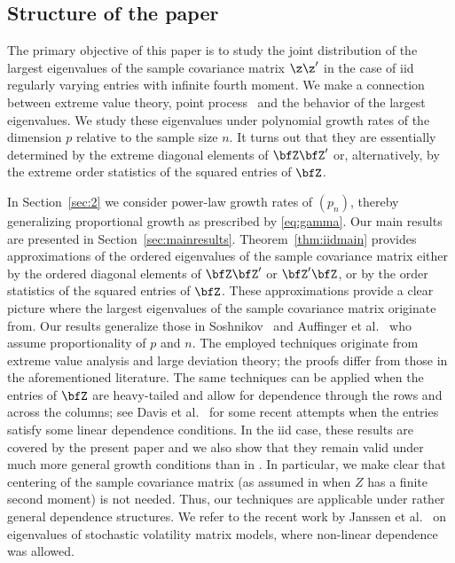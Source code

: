 \subsection{Structure of the paper}
The primary objective of this paper is to study the joint distribution of the largest eigenvalues of the sample covariance matrix $\z\z'$
in the case of iid regularly varying entries with infinite fourth moment.
We make a connection between extreme value theory, point process \con\ and the behavior of the largest eigenvalues. 
We study these eigenvalues under polynomial 
growth rates of the dimension $p$ relative to the sample size $n$. 
It turns out that they are essentially determined by the extreme diagonal elements of $\bfZ\bfZ'$ or, alternatively, 
by the extreme order statistics of the squared entries of $\bfZ$.  
\par
In Section~\ref{sec:2} we consider power-law growth rates of $(p_n)$, 
thereby generalizing proportional growth as prescribed by \eqref{eq:gamma}.
Our main results are presented in Section~\ref{sec:mainresults}. 
Theorem~\ref{thm:iidmain} provides approximations of the ordered eigenvalues of the sample covariance matrix either by
the ordered diagonal elements of $\bfZ\bfZ'$ or $\bfZ'\bfZ$, or by the order statistics of the squared entries of $\bfZ$.
These approximations provide a clear picture where the largest eigenvalues of the sample covariance matrix originate from. 
Our results generalize those in Soshnikov~\cite{soshnikov:2004,soshnikov:2006} and 
Auffinger et al.~\cite{auffinger:arous:peche:2009} who assume proportionality of $p$ and $n$.
The employed techniques originate from extreme value analysis and large deviation theory; the proofs differ from those 
in the aforementioned literature. 
The same techniques can be applied when the entries of $\bfZ$ 
are heavy-tailed and allow for dependence through the rows and across the columns; see 
Davis et al.~\cite{davis:mikosch:pfaffel:2016,davis:pfaffel:stelzer:2014} for some recent attempts 
when the entries satisfy some linear dependence conditions. In the iid case, these results are covered by the present paper
and we also show that they remain valid under much more general growth conditions than in \cite{davis:mikosch:pfaffel:2016,davis:pfaffel:stelzer:2014}. In particular, we make clear that centering of the sample covariance matrix (as assumed in 
\cite{davis:mikosch:pfaffel:2016,davis:pfaffel:stelzer:2014} when $Z$ has a finite second moment) is not needed. Thus, our techniques are applicable under rather general dependence structures. We refer to the recent work by Janssen et al.~\cite{janssen:mikosch:rezapour:xie:2016} on eigenvalues of stochastic volatility matrix models, where non-linear dependence was allowed.

